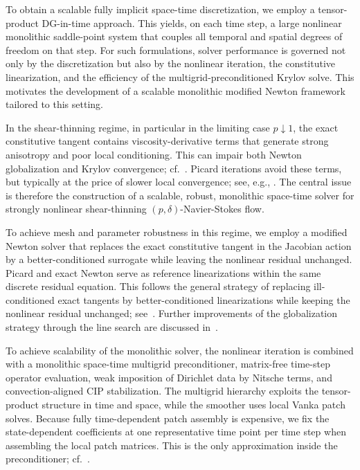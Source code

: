 \documentclass[DIV=16]{scrartcl}
\newcommand{\reg}{\delta}
\newcommand{\pn}{p}
\begin{document}
To obtain a scalable fully implicit space-time discretization, we employ a
tensor-product DG-in-time approach. This yields, on each time step, a large
nonlinear monolithic saddle-point system that couples all temporal and spatial
degrees of freedom on that step. For such formulations, solver performance is
governed not only by the discretization but also by the nonlinear iteration,
the constitutive linearization, and the efficiency of the
multigrid-preconditioned Krylov solve. This motivates the development of a
scalable monolithic modified Newton framework tailored to this setting.

In the shear-thinning regime, in particular in the limiting case $\pn\downarrow
1$, the exact constitutive tangent contains viscosity-derivative terms that
generate strong anisotropy and poor local conditioning. This can impair both
Newton globalization and Krylov convergence;
cf.~\cite{BarrettLiu1994Quasinorm,BelenkiBerselliDieningRuzicka2012pStokes}.
Picard iterations avoid these terms, but typically at the price of slower local
convergence; see, e.g., \cite{Toulopoulos2023DGPowerLaw}. The central issue is
therefore the construction of a scalable, robust, monolithic space-time solver
for strongly nonlinear shear-thinning $(\pn,\reg)$-Navier-Stokes flow.

To achieve mesh and parameter robustness in this regime, we employ a modified
Newton solver that replaces the exact constitutive tangent in the Jacobian
action by a better-conditioned surrogate while leaving the nonlinear residual
unchanged. Picard and exact Newton serve as reference linearizations within
the same discrete residual equation. This follows the general strategy of replacing ill-conditioned exact tangents
by better-conditioned linearizations while keeping the nonlinear residual
unchanged;
see~\cite{RudiShihStadler2020AdvancedNewton,ShihMehlmannLoschStadler2023PrimalDualNewton}.
Further improvements of the globalization strategy through the line search are
discussed in~\cite{schmidtNiko2025,wickTtoul2017}.

To achieve scalability of the monolithic solver, the nonlinear iteration is
combined with a monolithic space-time multigrid preconditioner, matrix-free
time-step operator evaluation, weak imposition of Dirichlet data by Nitsche
terms, and convection-aligned CIP stabilization. The multigrid hierarchy
exploits the tensor-product structure in time and space, while the smoother
uses local Vanka patch solves. Because fully time-dependent patch assembly is
expensive, we fix the state-dependent coefficients at one representative time
point per time step when assembling the local patch matrices. This is the only
approximation inside the preconditioner; cf.~\cite{MargenbergBause2026MonolithicSTMG}.
\end{document}
